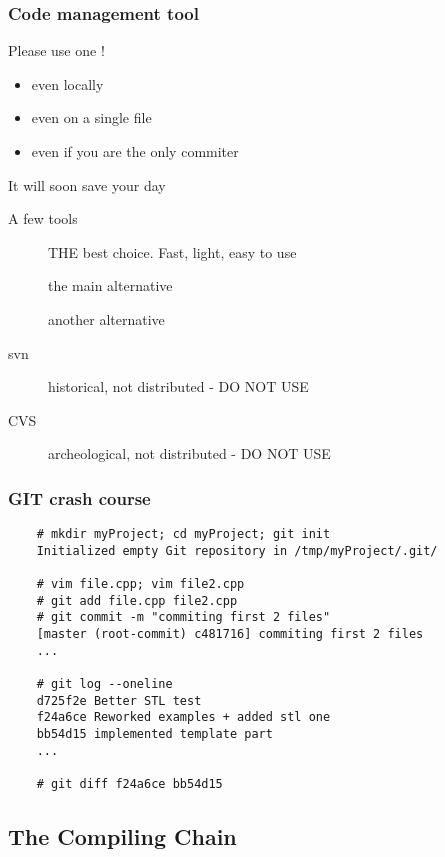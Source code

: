 \begin{frame}[fragile]
  \frametitle{Code management tool}
  \begin{alertblock}{Please use one !}
    \begin{itemize}
    \item even locally
    \item even on a single file
    \item even if you are the only commiter
    \end{itemize}
    It will soon save your day
  \end{alertblock}
  \begin{block}{A few tools}
    \begin{description}
    \item[\href{http://git-scm.com/}{}]
      THE best choice. Fast, light, easy to use
    \item[\href{http://mercurial.selenic.com/}{}]
      the main alternative
    \item[\href{http://bazaar.canonical.com/en/}{}]
      another alternative
    \item[svn]
      historical, not distributed - DO NOT USE
    \item[CVS]
      archeological, not distributed - DO NOT USE
    \end{description}
  \end{block}
\end{frame}

\begin{frame}[fragile]
  \frametitle{GIT crash course}
  \begin{verbatim}
    # mkdir myProject; cd myProject; git init
    Initialized empty Git repository in /tmp/myProject/.git/

    # vim file.cpp; vim file2.cpp
    # git add file.cpp file2.cpp
    # git commit -m "commiting first 2 files"
    [master (root-commit) c481716] commiting first 2 files
    ...

    # git log --oneline
    d725f2e Better STL test
    f24a6ce Reworked examples + added stl one
    bb54d15 implemented template part
    ...

    # git diff f24a6ce bb54d15
  \end{verbatim}
\end{frame}

\subsection[gcc]{The Compiling Chain}

